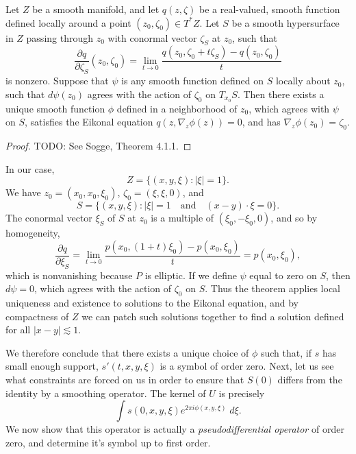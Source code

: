 \begin{lemma}
    Let $Z$ be a smooth manifold, and let $q(z,\zeta)$ be a real-valued, smooth function defined locally around a point $(z_0,\zeta_0) \in T^*Z$. Let $S$ be a smooth hypersurface in $Z$ passing through $z_0$ with conormal vector $\zeta_S$ at $z_0$, such that
    \[ \frac{\partial q}{\partial \zeta_S}(z_0,\zeta_0) = \lim_{t \to 0} \frac{q(z_0,\zeta_0 + t \zeta_S) - q(z_0,\zeta_0)}{t} \]
    is nonzero. Suppose that $\psi$ is any smooth function defined on $S$ locally about $z_0$, such that $d \psi(z_0)$ agrees with the action of $\zeta_0$ on $T_{x_0} S$. Then there exists a unique smooth function $\phi$ defined in a neighborhood of $z_0$, which agrees with $\psi$ on $S$, satisfies the Eikonal equation $q(z,\nabla_z \phi(z)) = 0$, and has $\nabla_z \phi(z_0) = \zeta_0$.
\end{lemma}
\begin{proof}
    TODO: See Sogge, Theorem 4.1.1.
\end{proof}

In our case,
%
\[ Z = \{ (x,y,\xi) : |\xi| = 1 \}. \]
%
We have $z_0 = (x_0,x_0,\xi_0)$, $\zeta_0 = (\xi,\xi,0)$, and
%
\[ S = \{ (x,y,\xi): |\xi| = 1 \quad\text{and}\quad (x - y) \cdot \xi = 0 \}. \]
%
The conormal vector $\xi_S$ of $S$ at $z_0$ is a multiple of $(\xi_0,-\xi_0,0)$, and so by homogeneity,
%
\[ \frac{\partial q}{\partial \xi_S} = \lim_{t \to 0} \frac{p(x_0,(1 + t)\xi_0) - p(x_0,\xi_0)}{t} = p(x_0,\xi_0), \]
%
which is nonvanishing because $P$ is elliptic. If we define $\psi$ equal to zero on $S$, then $d \psi = 0$, which agrees with the action of $\zeta_0$ on $S$. Thus the theorem applies local uniqueness and existence to solutions to the Eikonal equation, and by compactness of $Z$ we can patch such solutions together to find a solution defined for all $|x - y| \lesssim 1$.

We therefore conclude that there exists a unique choice of $\phi$ such that, if $s$ has small enough support, $s'(t,x,y,\xi)$ is a symbol of order zero. Next, let us see what constraints are forced on us in order to ensure that $S(0)$ differs from the identity by a smoothing operator. The kernel of $U$ is precisely
%
\[ \int s(0,x,y,\xi) e^{2 \pi i \phi(x,y,\xi)}\; d\xi. \]
%
We now show that this operator is actually a \emph{pseudodifferential operator} of order zero, and determine it's symbol up to first order.


